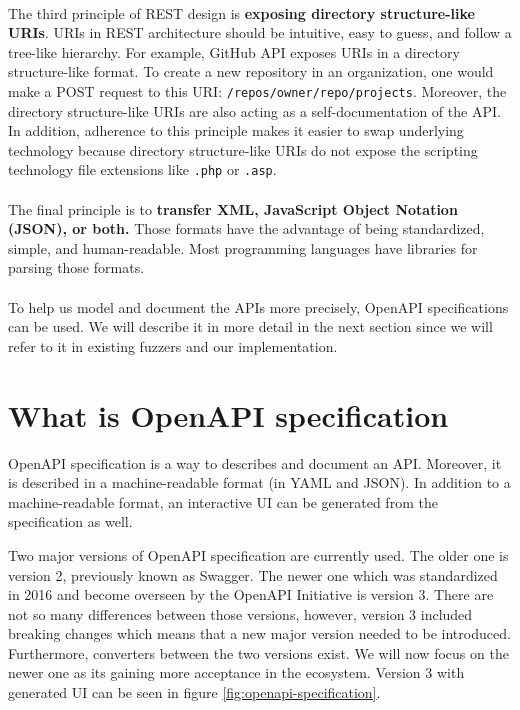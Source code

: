 \paragraph{}
The third principle of REST design is \textbf{exposing directory structure-like URIs}. URIs in REST architecture should be intuitive, easy to guess, and follow a tree-like hierarchy. For example, GitHub API exposes URIs in a directory structure-like format. To create a new repository in an organization, one would make a POST request to this URI: \texttt{/repos/{owner}/{repo}/projects}. Moreover, the directory structure-like URIs are also acting as a self-documentation of the API. In addition, adherence to this principle makes it easier to swap underlying technology because directory structure-like URIs do not expose the scripting technology file extensions like \texttt{.php} or \texttt{.asp}.

\paragraph{}
The final principle is to \textbf{transfer XML, JavaScript Object Notation (JSON), or both.} Those formats have the advantage of being standardized, simple, and human-readable. Most programming languages have libraries for parsing those formats.

\paragraph{}
To help us model and document the APIs more precisely, OpenAPI specifications can be used. We will describe it in more detail in the next section since we will refer to it in existing fuzzers and our implementation.


\section{What is OpenAPI specification}
\label{sec:openapi}
OpenAPI specification is a way to describes and document an API. Moreover, it is described in a  machine-readable format (in YAML \cite{ben2009yaml} and JSON). In addition to a machine-readable format, an interactive UI can be generated from the specification as well.

Two major versions of OpenAPI specification are currently used. The older one is version 2, previously known as Swagger. The newer one which was standardized in 2016 and become overseen by the OpenAPI Initiative \cite{openapi2020main} is version 3. There are not so many differences between those versions, however, version 3 included breaking changes which means that a new major version needed to be introduced. Furthermore, converters between the two versions exist. We will now focus on the newer one as its gaining more acceptance in the ecosystem. Version 3 with generated UI can be seen in figure \ref{fig:openapi-specification}.

